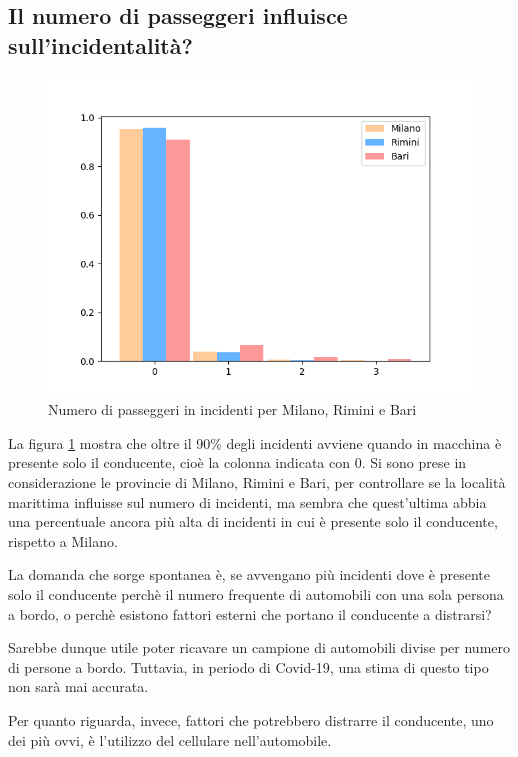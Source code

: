 \documentclass[a4paper]{report}
\begin{document}
\subsection{Il numero di passeggeri influisce sull'incidentalità?}

\begin{figure}
    \includegraphics[width=\linewidth]{../src/incidenti/incidenti_senza_coords/passeggeri/passeggeri.png}
    \caption{Numero di passeggeri in incidenti per Milano, Rimini e Bari}
    \label{fig:passeggeri-milano-rimini}
\end{figure}

La figura \ref{fig:passeggeri-milano-rimini} mostra che oltre il 90\% degli incidenti
avviene quando in macchina è presente solo il conducente, cioè la colonna indicata con 0.
Si sono prese in considerazione le provincie di Milano, Rimini e Bari, 
per controllare se la località marittima influisse sul numero di incidenti, 
ma sembra che quest'ultima abbia una percentuale 
ancora più alta di incidenti in cui è presente solo il conducente, rispetto a Milano.

La domanda che sorge spontanea è, se avvengano più incidenti dove è presente solo il conducente 
perchè il numero frequente di automobili con una sola persona a bordo, o perchè 
esistono fattori esterni che portano il conducente a distrarsi?

Sarebbe dunque utile poter ricavare un campione di automobili divise per numero di persone a bordo. 
Tuttavia, in periodo di Covid-19, una stima di questo tipo non sarà mai accurata.

Per quanto riguarda, invece, fattori che potrebbero distrarre il conducente, uno dei più 
ovvi, è l'utilizzo del cellulare nell'automobile.
\end{document}
